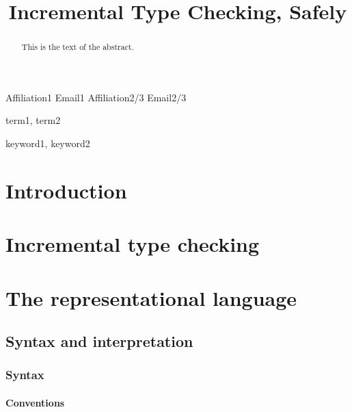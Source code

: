 \documentclass[9pt,authoryear]{sigplanconf}
\begin{document}
\copyrightdata{[to be supplied]} 


\title{Incremental Type Checking, Safely}

           {Affiliation1}
           {Email1}
           {Affiliation2/3}
           {Email2/3}

\maketitle

\begin{abstract}
This is the text of the abstract.
\end{abstract}


\terms
term1, term2

\keywords
keyword1, keyword2

\section{Introduction}

\section{Incremental type checking}

\section{The {\system} representational language}

\subsection{Syntax and interpretation}

\subsubsection{Syntax}

\paragraph{Conventions} 
\end{document}
